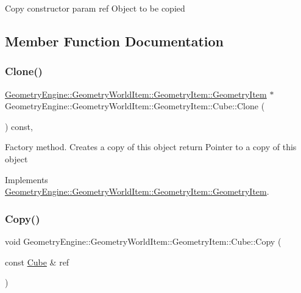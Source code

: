 Copy constructor param ref Object to be copied 

\subsection{Member Function Documentation}
\mbox{\label{class_geometry_engine_1_1_geometry_world_item_1_1_geometry_item_1_1_cube_ab151cd962c45bc06d21e9e26c2d1c4aa}} 
\subsubsection{\texorpdfstring{Clone()}{Clone()}}
{\footnotesize\ttfamily \mbox{\hyperlink{class_geometry_engine_1_1_geometry_world_item_1_1_geometry_item_1_1_geometry_item}{Geometry\+Engine\+::\+Geometry\+World\+Item\+::\+Geometry\+Item\+::\+Geometry\+Item}} $\ast$ Geometry\+Engine\+::\+Geometry\+World\+Item\+::\+Geometry\+Item\+::\+Cube\+::\+Clone (\begin{DoxyParamCaption}{ }\end{DoxyParamCaption}) const\hspace{0.3cm}{\ttfamily [override]}, {\ttfamily [virtual]}}

Factory method. Creates a copy of this object return Pointer to a copy of this object 

Implements \mbox{\hyperlink{class_geometry_engine_1_1_geometry_world_item_1_1_geometry_item_1_1_geometry_item_a1db8f97339ba49f746b3e0b4c4b02748}{Geometry\+Engine\+::\+Geometry\+World\+Item\+::\+Geometry\+Item\+::\+Geometry\+Item}}.

\mbox{\label{class_geometry_engine_1_1_geometry_world_item_1_1_geometry_item_1_1_cube_a36f20733aaadc9ab22a72eb87436b900}} 
\subsubsection{\texorpdfstring{Copy()}{Copy()}}
{\footnotesize\ttfamily void Geometry\+Engine\+::\+Geometry\+World\+Item\+::\+Geometry\+Item\+::\+Cube\+::\+Copy (\begin{DoxyParamCaption}\item[{const \mbox{\hyperlink{class_geometry_engine_1_1_geometry_world_item_1_1_geometry_item_1_1_cube}{Cube}} \&}]{ref }\end{DoxyParamCaption})\hspace{0.3cm}{\ttfamily [virtual]}}

